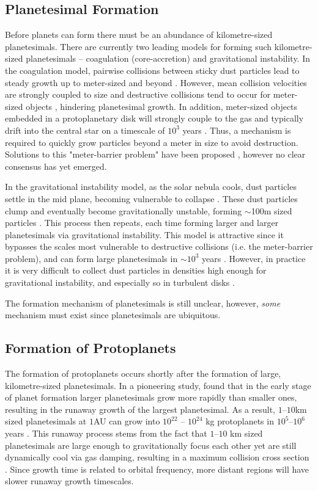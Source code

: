 \subsection{Planetesimal Formation}
Before planets can form there must be an abundance of kilometre-sized planetesimals.
There are currently two leading models for forming such kilometre-sized planetesimals -- coagulation (core-accretion) and gravitational instability. 
In the coagulation model, pairwise collisions between sticky dust particles lead to steady growth up to meter-sized and beyond \citep{Weidenschilling1977b, Armitage2010}.
However, mean collision velocities are strongly coupled to size and destructive collisions tend to occur for meter-sized objects \citep{Weidenschilling1977b, Blum2008}, hindering planetesimal growth. 
In addition, meter-sized objects embedded in a protoplanetary disk will strongly couple to the gas and typically drift into the central star on a timescale of $10^3$ years \citep{Weidenschilling1977b}.
Thus, a mechanism is required to quickly grow particles beyond a meter in size to avoid destruction. 
Solutions to this "meter-barrier problem" have been proposed \citep[e.g.][]{Boley2014}, however no clear consensus has yet emerged.  

In the gravitational instability model, as the solar nebula cools, dust particles settle in the mid plane, becoming vulnerable to collapse \citep{Goldreich1973}.
These dust particles clump and eventually become gravitationally unstable, forming $\sim$100m sized particles \citep{Goldreich1973}. 
This process then repeats, each time forming larger and larger planetesimals via gravitational instability.
This model is attractive since it bypasses the scales most vulnerable to destructive collisions (i.e. the meter-barrier problem), and can form large planetesimals in $\sim 10^3$ years \citep{Goldreich1973, Armitage2007}.
However, in practice it is very difficult to collect dust particles in densities high enough for gravitational instability, and especially so in turbulent disks \citep{Armitage2007}.
 
The formation mechanism of planetesimals is still unclear, however, \textit{some} mechanism must exist since planetesimals are ubiquitous. 

\subsection{Formation of Protoplanets}
The formation of protoplanets occurs shortly after the formation of large, kilometre-sized planetesimals.
In a pioneering study, \citet{Greenberg1978} found that in the early stage of planet formation larger planetesimals grow more rapidly than smaller ones, resulting in the runaway growth of the largest planetesimal. 
As a result, $1$--$10$km sized planetesimals at $1$AU can grow into $10^{22}$ -- $10^{24}$ kg protoplanets in $10^5$--$10^6$ years \citep{Wetherill1989}.
This runaway process stems from the fact that $1$--$10$ km sized planetesimals are large enough to gravitationally focus each other yet are still dynamically cool via gas damping, resulting in a maximum collision cross section \citep{Armitage2010}.
Since growth time is related to orbital frequency, more distant regions will have slower runaway growth timescales.


